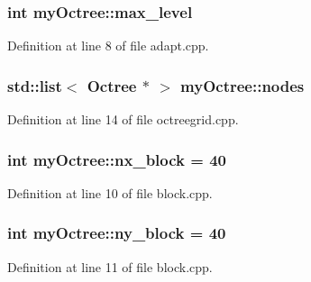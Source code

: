 \hypertarget{namespacemy_octree_ae2a304436a1b08f28c93d8e54026c8bb}{}
\subsubsection[{max\+\_\+level}]{\setlength{\rightskip}{0pt plus 5cm}int my\+Octree\+::max\+\_\+level}\label{namespacemy_octree_ae2a304436a1b08f28c93d8e54026c8bb}


Definition at line 8 of file adapt.\+cpp.

\hypertarget{namespacemy_octree_a8c21e6b5a77ff973d7422aeb09230f2d}{}
\subsubsection[{nodes}]{\setlength{\rightskip}{0pt plus 5cm}std\+::list$<$ {\bf Octree} $\ast$ $>$ my\+Octree\+::nodes}\label{namespacemy_octree_a8c21e6b5a77ff973d7422aeb09230f2d}


Definition at line 14 of file octreegrid.\+cpp.

\hypertarget{namespacemy_octree_a7f30e98430213a41919e16e40abc2078}{}
\subsubsection[{nx\+\_\+block}]{\setlength{\rightskip}{0pt plus 5cm}int my\+Octree\+::nx\+\_\+block = 40}\label{namespacemy_octree_a7f30e98430213a41919e16e40abc2078}


Definition at line 10 of file block.\+cpp.

\hypertarget{namespacemy_octree_a39784fe68930da363b3ad335a47bed19}{}
\subsubsection[{ny\+\_\+block}]{\setlength{\rightskip}{0pt plus 5cm}int my\+Octree\+::ny\+\_\+block = 40}\label{namespacemy_octree_a39784fe68930da363b3ad335a47bed19}


Definition at line 11 of file block.\+cpp.

\hypertarget{namespacemy_octree_a2b2fa3a7759c3ff5b129847af3e09cc3}{}
